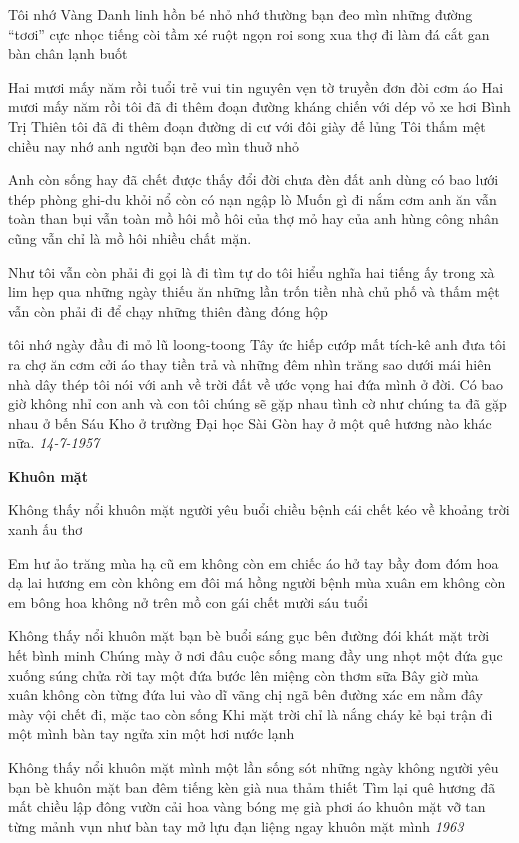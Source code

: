 \documentclass[../main.tex]{subfiles}
\begin{document}
\begin{multicols}{2}
Tôi nhớ Vàng Danh linh hồn bé nhỏ 
nhớ thường bạn đeo mìn 
những đường “tơơi” cực nhọc 
tiếng còi tầm xé ruột 
ngọn roi song xua thợ đi làm 
đá cắt gan bàn chân lạnh buốt 
 
Hai mươi mấy năm rồi tuổi trẻ vui tin 
nguyên vẹn tờ truyền đơn đòi cơm áo 
Hai mươi mấy năm rồi 
tôi đã đi thêm đoạn đường kháng chiến  
với dép vỏ xe hơi Bình Trị Thiên 
tôi đã đi thêm đoạn đường di cư 
với đôi giày đế lủng 
Tôi thấm mệt chiều nay nhớ anh người bạn đeo mìn thuở nhỏ 
 
Anh còn sống hay đã chết 
được thấy đổi đời chưa 
đèn đất anh dùng có bao lưới thép phòng ghi-du khỏi nổ 
còn có nạn ngập lò 
Muốn gì đi nắm cơm anh ăn vẫn toàn than bụi 
vẫn toàn mồ hôi 
mồ hôi của thợ mỏ hay của anh hùng công nhân cũng vẫn chỉ là mồ hôi 
nhiều chất mặn. 
 
Như tôi vẫn còn phải đi 
gọi là đi tìm tự do 
tôi hiểu nghĩa hai tiếng ấy trong xà lim hẹp 
qua những ngày thiếu ăn 
những lần trốn tiền nhà chủ phố 
và thấm mệt vẫn còn phải đi 
để chạy những thiên đàng đóng hộp 
 
tôi nhớ ngày đầu đi mỏ 
lũ loong-toong Tây ức hiếp cướp mất tích-kê 
anh đưa tôi ra chợ ăn cơm cởi áo thay tiền trả 
và những đêm nhìn trăng sao 
dưới mái hiên nhà dây thép tôi nói với anh về trời đất 
về ước vọng hai đứa mình ở đời. 
Có bao giờ không nhỉ 
con anh và con tôi 
chúng sẽ gặp nhau tình cờ như chúng ta đã gặp nhau 
ở bến Sáu Kho 
ở trường Đại học Sài Gòn 
hay ở một quê hương nào khác nữa. 
\textit{14-7-1957} 
 
 
\textbf{Khuôn mặt} 
 
Không thấy nổi khuôn mặt người yêu 
buổi chiều bệnh cái chết kéo về khoảng trời xanh ấu thơ 
 
Em hư ảo trăng mùa hạ cũ 
em không còn em 
chiếc áo hở tay bầy đom đóm hoa dạ lai hương 
em còn không em 
đôi má hồng người bệnh mùa xuân 
em không còn em 
bông hoa không nở trên mồ con gái chết mười sáu tuổi 
 
Không thấy nổi khuôn mặt bạn bè 
buổi sáng gục bên đường đói khát 
mặt trời hết bình minh 
Chúng mày ở nơi đâu 
cuộc sống mang đầy ung nhọt 
một đứa gục xuống súng chửa rời tay 
một đứa bước lên miệng còn thơm sữa 
Bây giờ mùa xuân không còn 
từng đứa lui vào dĩ vãng 
chị ngã bên đường xác em nằm đây 
mày vội chết đi, mặc tao còn sống  
Khi mặt trời chỉ là nắng cháy 
kẻ bại trận đi một mình 
bàn tay ngửa xin một hơi nước lạnh 
 
Không thấy nổi khuôn mặt mình  
một lần sống sót 
những ngày không người yêu bạn bè 
khuôn mặt ban đêm tiếng kèn già nua thảm thiết 
Tìm lại quê hương đã mất 
chiều lập đông vườn cải hoa vàng 
bóng mẹ già phơi áo 
khuôn mặt vỡ tan từng mảnh vụn 
như bàn tay mở lựu đạn  
liệng ngay khuôn mặt mình 
\textit{1963} 
 

\end{multicols}
\end{document}

